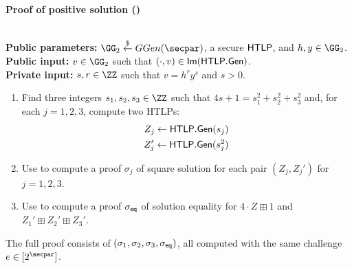     \begin{mdframed}
    \begin{center}
        \textbf{Proof of positive solution (\zkpopos)}
    \end{center}
    \hfill\\
    \textbf{Public parameters:} $\GG_2 \sample GGen(\secpar)$, a secure $\mathsf{HTLP}$, and $h,y \in \GG_2$. \hfill\\
    \textbf{Public input:} $v \in \GG_2$ such that $(\cdot,v) \in {\sf Im}(\mathsf{HTLP}.{\sf Gen})$. \hfill\\
    \textbf{Private input:} $s, r \in \ZZ$ such that $v = h^r y^s$ and $s > 0$.
    \begin{enumerate}
        \item Find three integers $s_1, s_2, s_3 \in \ZZ$ such that $4s + 1 = s_1^2 + s_2^2 + s_3^2$ and, for each $j = 1, 2, 3$, compute two HTLPs: 
        \begin{align*}
        Z_j \gets \mathsf{HTLP}.{\sf Gen}(s_j) \\
        Z_j' \gets \mathsf{HTLP}.{\sf Gen}(s_j^2)
        \end{align*}
        \item Use \zkposqs to compute a proof $\sigma_j$ of square solution for each pair $(Z_j, Z_j')$ for $j=1, 2, 3$.
        \item Use \zkposeq to compute a proof $\sigma_{\sf eq}$ of solution equality for $4 \cdot Z \boxplus 1$ and $Z_1' \boxplus Z_2' \boxplus Z_3'$.
    \end{enumerate}
    The full proof consists of $(\sigma_1, \sigma_2, \sigma_3, \sigma_{\sf eq})$, all computed with the same challenge $e \in [2^\secpar]$.
    \end{mdframed}
